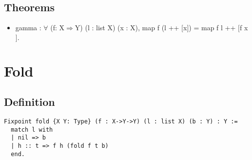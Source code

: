 \documentclass[12pt,a4paper]{article}
\theoremstyle{case}
\begin{document}
\subsection{Theorems}
\begin{itemize}
    \item gamma : $\forall$ (f: X$\Rightarrow$Y) (l : list X) (x : X), map f (l ++ $[$x$]$) = map f l ++ $[$f x$]$.
\end{itemize}


\section{Fold}
\subsection{Definition}
\begin{verbatim}
Fixpoint fold {X Y: Type} (f : X->Y->Y) (l : list X) (b : Y) : Y :=
  match l with
  | nil => b
  | h :: t => f h (fold f t b)
  end.
\end{verbatim}
\end{document}
